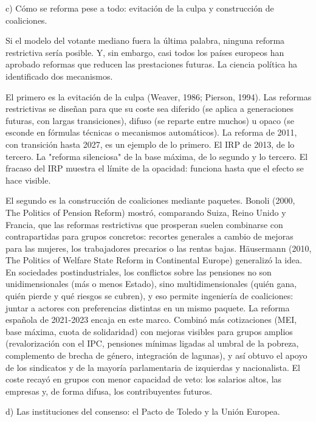 \documentclass[10pt,a4paper]{article}
\begin{document}
c) Cómo se reforma pese a todo: evitación de la culpa y construcción de coaliciones.

Si el modelo del votante mediano fuera la última palabra, ninguna reforma restrictiva sería posible. Y, sin embargo, casi todos los países europeos han aprobado reformas que reducen las prestaciones futuras. La ciencia política ha identificado dos mecanismos.

El primero es la evitación de la culpa (Weaver, 1986; Pierson, 1994). Las reformas restrictivas se diseñan para que su coste sea diferido (se aplica a generaciones futuras, con largas transiciones), difuso (se reparte entre muchos) u opaco (se esconde en fórmulas técnicas o mecanismos automáticos). La reforma de 2011, con transición hasta 2027, es un ejemplo de lo primero. El IRP de 2013, de lo tercero. La "reforma silenciosa" de la base máxima, de lo segundo y lo tercero. El fracaso del IRP muestra el límite de la opacidad: funciona hasta que el efecto se hace visible.

El segundo es la construcción de coaliciones mediante paquetes. Bonoli (2000, The Politics of Pension Reform) mostró, comparando Suiza, Reino Unido y Francia, que las reformas restrictivas que prosperan suelen combinarse con contrapartidas para grupos concretos: recortes generales a cambio de mejoras para las mujeres, los trabajadores precarios o las rentas bajas. Häusermann (2010, The Politics of Welfare State Reform in Continental Europe) generalizó la idea. En sociedades postindustriales, los conflictos sobre las pensiones no son unidimensionales (más o menos Estado), sino multidimensionales (quién gana, quién pierde y qué riesgos se cubren), y eso permite ingeniería de coaliciones: juntar a actores con preferencias distintas en un mismo paquete. La reforma española de 2021-2023 encaja en este marco. Combinó más cotizaciones (MEI, base máxima, cuota de solidaridad) con mejoras visibles para grupos amplios (revalorización con el IPC, pensiones mínimas ligadas al umbral de la pobreza, complemento de brecha de género, integración de lagunas), y así obtuvo el apoyo de los sindicatos y de la mayoría parlamentaria de izquierdas y nacionalista. El coste recayó en grupos con menor capacidad de veto: los salarios altos, las empresas y, de forma difusa, los contribuyentes futuros.

d) Las instituciones del consenso: el Pacto de Toledo y la Unión Europea.
\end{document}
